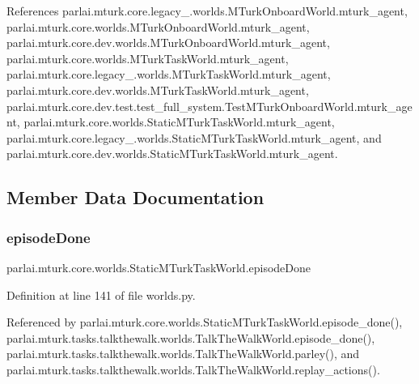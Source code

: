 References parlai.\+mturk.\+core.\+legacy\+\_.\+worlds.\+M\+Turk\+Onboard\+World.\+mturk\+\_\+agent, parlai.\+mturk.\+core.\+worlds.\+M\+Turk\+Onboard\+World.\+mturk\+\_\+agent, parlai.\+mturk.\+core.\+dev.\+worlds.\+M\+Turk\+Onboard\+World.\+mturk\+\_\+agent, parlai.\+mturk.\+core.\+worlds.\+M\+Turk\+Task\+World.\+mturk\+\_\+agent, parlai.\+mturk.\+core.\+legacy\+\_.\+worlds.\+M\+Turk\+Task\+World.\+mturk\+\_\+agent, parlai.\+mturk.\+core.\+dev.\+worlds.\+M\+Turk\+Task\+World.\+mturk\+\_\+agent, parlai.\+mturk.\+core.\+dev.\+test.\+test\+\_\+full\+\_\+system.\+Test\+M\+Turk\+Onboard\+World.\+mturk\+\_\+agent, parlai.\+mturk.\+core.\+worlds.\+Static\+M\+Turk\+Task\+World.\+mturk\+\_\+agent, parlai.\+mturk.\+core.\+legacy\+\_.\+worlds.\+Static\+M\+Turk\+Task\+World.\+mturk\+\_\+agent, and parlai.\+mturk.\+core.\+dev.\+worlds.\+Static\+M\+Turk\+Task\+World.\+mturk\+\_\+agent.



\subsection{Member Data Documentation}
\mbox{\label{classparlai_1_1mturk_1_1core_1_1worlds_1_1StaticMTurkTaskWorld_a2f913dd10cf988cb7e67cdc9efaa6802}} 
\subsubsection{\texorpdfstring{episode\+Done}{episodeDone}}
{\footnotesize\ttfamily parlai.\+mturk.\+core.\+worlds.\+Static\+M\+Turk\+Task\+World.\+episode\+Done}



Definition at line 141 of file worlds.\+py.



Referenced by parlai.\+mturk.\+core.\+worlds.\+Static\+M\+Turk\+Task\+World.\+episode\+\_\+done(), parlai.\+mturk.\+tasks.\+talkthewalk.\+worlds.\+Talk\+The\+Walk\+World.\+episode\+\_\+done(), parlai.\+mturk.\+tasks.\+talkthewalk.\+worlds.\+Talk\+The\+Walk\+World.\+parley(), and parlai.\+mturk.\+tasks.\+talkthewalk.\+worlds.\+Talk\+The\+Walk\+World.\+replay\+\_\+actions().

